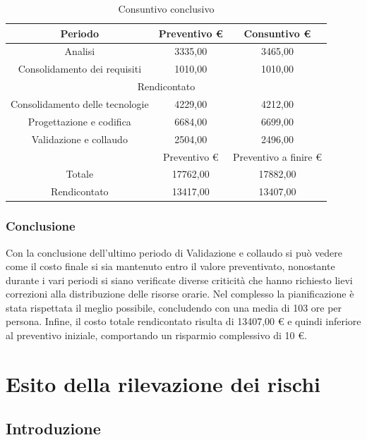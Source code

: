 \documentclass[./PianodiProgetto.tex]{subfiles}
\begin{document}
\begin{table}[H]
	\centering
	\begin{tabular}{|c|c|c|}
		\hline
		Periodo&Preventivo \euro{}&Consuntivo \euro{} \\ \hline
		Analisi&3335,00&3465,00  \\ \hline
		Consolidamento dei requisiti&1010,00&1010,00  \\ \hline
		\multicolumn{3}{|c|}{Rendicontato}  \\ \hline
		Consolidamento delle tecnologie&4229,00&4212,00  \\ \hline
		Progettazione e codifica&6684,00&6699,00  \\ \hline
		Validazione e collaudo&2504,00&2496,00  \\ \hline
		&Preventivo \euro{}&Preventivo a finire \euro{}  \\ \hline
		Totale&17762,00&17882,00 \\ \hline
		Rendicontato&13417,00&13407,00 \\ \hline
	\end{tabular}
	\caption{Consuntivo conclusivo}
\end{table}


\subsection{Conclusione}
Con la conclusione dell'ultimo periodo di Validazione e collaudo si può vedere come il
costo finale si sia mantenuto entro il valore preventivato, nonostante durante i vari periodi
si siano verificate diverse criticità che hanno richiesto lievi correzioni alla distribuzione
delle risorse orarie. Nel complesso la pianificazione è stata rispettata il meglio possibile,
concludendo con una media di 103 ore per persona.
Infine, il costo totale rendicontato risulta di 13407,00 \euro{} e quindi inferiore al preventivo
iniziale, comportando un risparmio complessivo di 10 \euro{}.


\appendix


\appendix

\chapter{Esito della rilevazione dei rischi}

\section{Introduzione}
\end{document}
